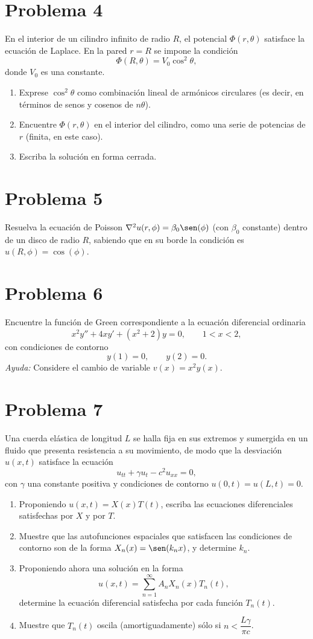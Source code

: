 \documentclass[12pt]{article}
\begin{document}
\section*{Problema 4}
En el interior de un cilindro infinito de radio \(R\), el potencial \(\Phi(r, \theta)\) satisface la ecuación de Laplace. En la pared \(r = R\) se impone la condición
\[
\Phi(R, \theta) = V_0 \cos^2 \theta,
\]
donde \(V_0\) es una constante.
\begin{enumerate}
    \item[(a)] Exprese \(\cos^2 \theta\) como combinación lineal de armónicos circulares (es decir, en términos de senos y cosenos de \(n\theta\)).
    \item[(b)] Encuentre \(\Phi(r, \theta)\) en el interior del cilindro, como una serie de potencias de \(r\) (finita, en este caso).
    \item[(c)] Escriba la solución en forma cerrada.
\end{enumerate}

\section*{Problema 5}
Resuelva la ecuación de Poisson \(\nabla^2 u(r, \phi) = \beta_0 \sen(\phi)\) (con \(\beta_0\) constante) dentro de un disco de radio \(R\), sabiendo que en su borde la condición es \(u(R, \phi) = \cos(\phi)\).

\section*{Problema 6}
Encuentre la función de Green correspondiente a la ecuación diferencial ordinaria
\[
x^2 y'' + 4xy' + (x^2 + 2)y = 0, \qquad 1 < x < 2,
\]
con condiciones de contorno
\[
y(1) = 0, \qquad y(2) = 0.
\]
\textit{Ayuda:} Considere el cambio de variable \(v(x) = x^2 y(x)\).

\section*{Problema 7}
Una cuerda elástica de longitud \(L\) se halla fija en sus extremos y sumergida en un fluido que presenta resistencia a su movimiento, de modo que la desviación \(u(x, t)\) satisface la ecuación
\[
u_{tt} + \gamma u_t - c^2 u_{xx} = 0,
\]
con \(\gamma\) una constante positiva y condiciones de contorno \(u(0,t) = u(L,t) = 0\).
\begin{enumerate}
    \item[(a)] Proponiendo \(u(x,t) = X(x)T(t)\), escriba las ecuaciones diferenciales satisfechas por \(X\) y por \(T\).
    \item[(b)] Muestre que las autofunciones espaciales que satisfacen las condiciones de contorno son de la forma \(X_n(x) = \sen(k_n x)\), y determine \(k_n\).
    \item[(c)] Proponiendo ahora una solución en la forma
    \[
    u(x, t) = \sum_{n=1}^{\infty} A_n X_n(x) T_n(t),
    \]
    determine la ecuación diferencial satisfecha por cada función \(T_n(t)\).
    \item[(d)] Muestre que \(T_n(t)\) oscila (amortiguadamente) sólo si \(n < \dfrac{L\gamma}{\pi c}\).
\end{enumerate}
\end{document}
